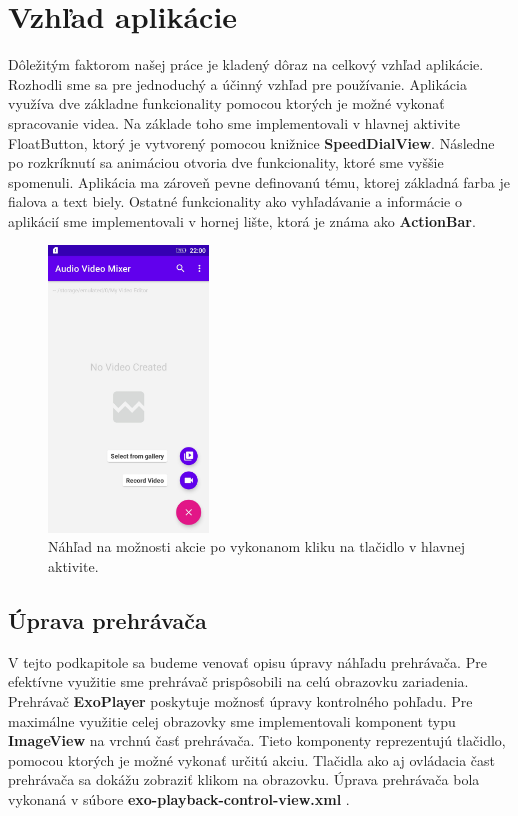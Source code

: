 \documentclass[12pt, oneside]{book}
\begin{document}
\section{Vzhľad aplikácie}

\hspace{15pt} Dôležitým faktorom našej práce je kladený dôraz na celkový vzhľad aplikácie. Rozhodli sme sa pre jednoduchý a účinný vzhľad pre používanie. Aplikácia využíva dve základne funkcionality pomocou ktorých je možné vykonať spracovanie videa. Na základe toho sme implementovali v hlavnej aktivite FloatButton, ktorý je vytvorený pomocou knižnice \textbf{SpeedDialView}. Následne po rozkríknutí sa animáciou otvoria dve funkcionality, ktoré sme vyššie spomenuli. Aplikácia ma zároveň pevne definovanú tému, ktorej základná farba je fialova a text biely. Ostatné funkcionality ako vyhľadávanie a informácie o aplikácií sme implementovali v hornej lište, ktorá je známa ako \textbf{ActionBar}.

\begin{figure}[H]
    \centering
    \includegraphics[width=0.38\textwidth]{images/main.jpg}
    \caption{Náhľad na možnosti akcie po vykonanom kliku na tlačidlo v hlavnej aktivite. }
    \label{fig:obr07}
\end{figure}

\subsection{Úprava prehrávača}

\hspace{15pt} V tejto podkapitole sa budeme venovať opisu úpravy náhľadu prehrávača. Pre efektívne využitie sme prehrávač prispôsobili na celú obrazovku zariadenia. Prehrávač \textbf{ExoPlayer} poskytuje možnosť úpravy kontrolného pohľadu. Pre maximálne využitie celej obrazovky sme implementovali komponent typu \textbf{ImageView} na vrchnú časť prehrávača. Tieto komponenty reprezentujú tlačidlo, pomocou ktorých je možné vykonať určitú akciu. Tlačidla ako aj ovládacia čast prehrávača sa dokážu zobraziť klikom na obrazovku. Úprava prehrávača bola vykonaná v súbore \textbf{exo-playback-control-view.xml} .
\end{document}
